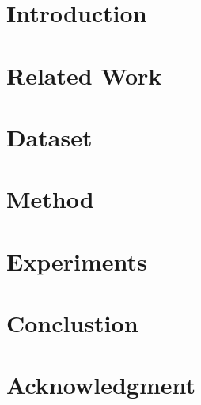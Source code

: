 \documentclass[conference]{IEEEtran}
\begin{document}



\section{Introduction}
 

\section{Related Work}


\section{Dataset}


\section{Method}


\section{Experiments}


\section{Conclustion}


\section*{Acknowledgment}




\end{document}
